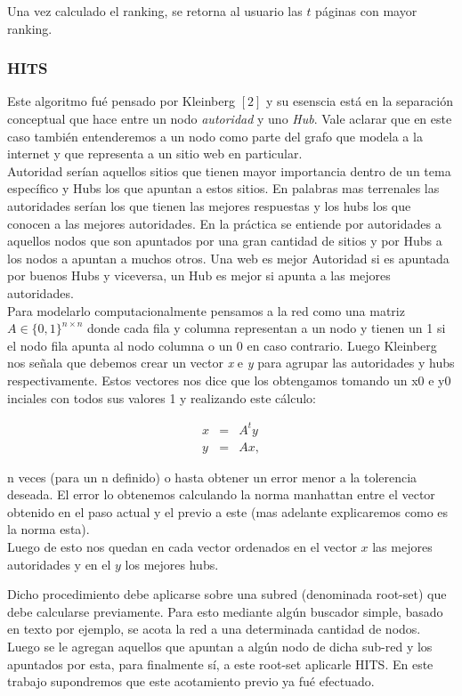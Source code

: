 Una vez calculado el ranking, se retorna al usuario las $t$ p\'aginas con mayor ranking.


\subsubsection{HITS}

Este algoritmo fué pensado por Kleinberg $[2]$ y su esenscia está en la separación conceptual que hace entre un nodo \textit{autoridad} y uno \textit{Hub}. Vale aclarar que en este caso también entenderemos a un nodo como parte del grafo que modela a la internet y que representa a un sitio web en particular. \\
Autoridad serían aquellos sitios que tienen mayor importancia dentro de un tema específico y Hubs los que apuntan a estos sitios. En palabras mas terrenales las autoridades serían los que tienen las mejores respuestas y los hubs los que conocen a las mejores autoridades.
En la práctica se entiende por autoridades a aquellos nodos que son apuntados por una gran cantidad de sitios y por Hubs a los nodos a apuntan a muchos otros. Una web es mejor Autoridad si es apuntada por buenos Hubs y viceversa, un Hub es mejor si apunta a las mejores autoridades.\\
Para modelarlo computacionalmente pensamos a la red como una matriz $A \in \{0,1\}^{n \times n}$ donde cada fila y columna representan a un nodo y tienen un 1 si el nodo fila apunta al nodo columna o un 0 en caso contrario. Luego Kleinberg nos señala que debemos crear un vector \textit{x} e \textit{y} para agrupar las autoridades y hubs respectivamente. Estos vectores nos dice que los obtengamos tomando un x0 e y0 inciales con todos sus valores 1 y realizando este cálculo:

\begin{eqnarray}
x & = & A^ty \label{eq:auth-update-math} \\
y & = & Ax, \label{eq:hub-update-math} 
\end{eqnarray}

n veces (para un n definido) o hasta obtener un error menor a la tolerencia deseada. El error lo obtenemos calculando la norma manhattan entre el vector obtenido en el paso actual y el previo a este (mas adelante explicaremos como es la norma esta).\\
Luego de esto nos quedan en cada vector ordenados en el vector $x$ las mejores autoridades y en el $y$ los mejores hubs.

Dicho procedimiento debe aplicarse sobre una subred (denominada root-set) que debe calcularse previamente. Para esto mediante algún buscador simple, basado en texto por ejemplo, se acota la red a una determinada cantidad de nodos. Luego se le agregan aquellos que apuntan a algún nodo de dicha sub-red y los apuntados por esta, para finalmente sí, a este root-set aplicarle HITS. En este trabajo supondremos que este acotamiento previo ya fué efectuado.


